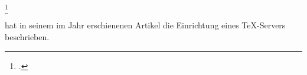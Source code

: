\documentclass[12pt,ngerman,parskip=half]{scrartcl}
\begin{document}
\blindtext 

\cite{Knuth:1984}

\blindtext 
 
\cite{ziegenhagen:2017}

\parencite{Knuth:1984}

\parencite{ziegenhagen:2017}

\blindtext\footcite{Knuth:1984}

\citeauthor{ziegenhagen:2017} hat in seinem im Jahr \citeyear{ziegenhagen:2017} erschienenen Artikel  die Einrichtung eines \TeX-Servers beschrieben.
  

\printbibliography
\end{document}
